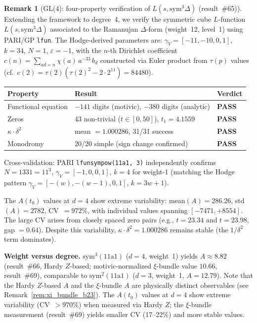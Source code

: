 \documentclass[11pt, a4paper]{article}
\theoremstyle{definition}
\newtheorem{remark}{Remark}[section]
\theoremstyle{plain}
\begin{document}
\begin{remark}[GL(4): four-property verification of $L(s, \mathrm{sym}^3\Delta)$ (result~\#65)]
\label{rem:gl4_sym3_delta}
Extending the framework to degree~4, we verify the symmetric cube $L$-function
$L(s, \mathrm{sym}^3\Delta)$ associated to the Ramanujan $\Delta$-form
(weight~12, level~1) using PARI/GP \texttt{lfun}.
The Hodge-derived parameters are:
$\gamma_V = [-11, -10, 0, 1]$, $k = 34$, $N = 1$, $\varepsilon = -1$,
with the $n$-th Dirichlet coefficient
$c(n) = \sum_{ad{=}n} \chi(a)\, a^{-33}\, b_d$ constructed via Euler product
from $\tau(p)$ values (cf.\ $c(2) = \tau(2)(\tau(2)^2 - 2 \cdot 2^{11}) = 84480$).

\smallskip
\begin{center}
\small
\begin{tabular}{@{}lll@{}}
\toprule
Property & Result & Verdict \\
\midrule
Functional equation & $-141$ digits (motivic), $-380$ digits (analytic) & \textbf{PASS} \\
Zeros & 43 non-trivial ($t \in [0,50]$), $t_1 = 4.1559$ & \textbf{PASS} \\
$\kappa\cdot\delta^2$ & mean $= 1.000286$, 31/31 success & \textbf{PASS} \\
Monodromy & 20/20 simple (sign change confirmed) & \textbf{PASS} \\
\bottomrule
\end{tabular}
\end{center}
\smallskip\noindent
Cross-validation: PARI \texttt{lfunsympow(11a1, 3)} independently confirms
$N = 1331 = 11^3$, $\gamma_V = [-1, 0, 0, 1]$, $k = 4$ for weight-1
(matching the Hodge pattern $\gamma_V = [-(w), -(w{-}1), 0, 1]$, $k = 3w+1$).

The $A(t_0)$ values at $d = 4$ show extreme variability:
mean$(A) = 286.26$, std$(A) = 2782$, CV~$= 972\%$,
with individual values spanning $[-7471, +8554]$.
The large CV arises from closely spaced zero pairs
(e.g., $t = 23.34$ and $t = 23.98$, gap $= 0.64$).
Despite this variability, $\kappa{\cdot}\delta^2 = 1.000286$ remains stable (the $1/\delta^2$ term dominates).

\textbf{Weight versus degree.}
$\mathrm{sym}^3(11\mathrm{a}1)$ ($d = 4$, weight~1) yields $A \approx 8.82$ (result~\#66,
Hardy $Z$-based; motivic-normalized $\xi$-bundle value $10.66$, result~\#69),
comparable to $\mathrm{sym}^2(11\mathrm{a}1)$ ($d = 3$, weight~1, $A = 12.79$).
Note that the Hardy $Z$-based $A$ and the $\xi$-bundle $A$ are physically
distinct observables (see Remark~\ref{rem:xi_bundle_b23}).
The $A(t_0)$ values at $d = 4$ show extreme variability (CV~$>970\%$) when
measured via Hardy $Z$; the $\xi$-bundle measurement (result~\#69) yields
smaller CV (17--22\%) and more stable values.


\end{remark}
\end{document}
